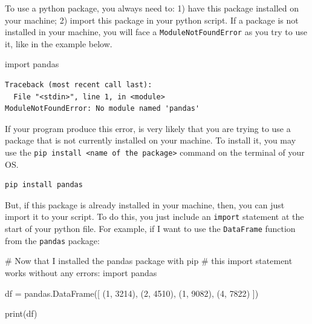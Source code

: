 \documentclass[
  11pt,
  letterpaper,
  DIV=11,
  numbers=noendperiod]{scrreprt}
\newenvironment{Shaded}{\begin{snugshade}}{\end{snugshade}}
\newcommand{\BuiltInTok}[1]{\textcolor[rgb]{0.00,0.23,0.31}{#1}}
\newcommand{\CommentTok}[1]{\textcolor[rgb]{0.37,0.37,0.37}{#1}}
\newcommand{\DecValTok}[1]{\textcolor[rgb]{0.68,0.00,0.00}{#1}}
\newcommand{\ImportTok}[1]{\textcolor[rgb]{0.00,0.46,0.62}{#1}}
\newcommand{\NormalTok}[1]{\textcolor[rgb]{0.00,0.23,0.31}{#1}}
\newcommand{\OperatorTok}[1]{\textcolor[rgb]{0.37,0.37,0.37}{#1}}
\begin{document}
To use a python package, you always need to: 1) have this package
installed on your machine; 2) import this package in your python script.
If a package is not installed in your machine, you will face a
\texttt{ModuleNotFoundError} as you try to use it, like in the example
below.

\begin{Shaded}
\begin{Highlighting}[]
\ImportTok{import}\NormalTok{ pandas}
\end{Highlighting}
\end{Shaded}

\begin{verbatim}
Traceback (most recent call last):
  File "<stdin>", line 1, in <module>
ModuleNotFoundError: No module named 'pandas'
\end{verbatim}

If your program produce this error, is very likely that you are trying
to use a package that is not currently installed on your machine. To
install it, you may use the
\texttt{pip\ install\ \textless{}name\ of\ the\ package\textgreater{}}
command on the terminal of your OS.

\begin{verbatim}
pip install pandas
\end{verbatim}

But, if this package is already installed in your machine, then, you can
just import it to your script. To do this, you just include an
\texttt{import} statement at the start of your python file. For example,
if I want to use the \texttt{DataFrame} function from the
\texttt{pandas} package:

\begin{Shaded}
\begin{Highlighting}[]
\CommentTok{\# Now that I installed the \textasciigrave{}pandas\textasciigrave{} package with \textasciigrave{}pip\textasciigrave{}}
\CommentTok{\# this \textasciigrave{}import\textasciigrave{} statement works without any errors:}
\ImportTok{import}\NormalTok{ pandas}

\NormalTok{df }\OperatorTok{=}\NormalTok{ pandas.DataFrame([}
\NormalTok{  (}\DecValTok{1}\NormalTok{, }\DecValTok{3214}\NormalTok{), (}\DecValTok{2}\NormalTok{, }\DecValTok{4510}\NormalTok{), }
\NormalTok{  (}\DecValTok{1}\NormalTok{, }\DecValTok{9082}\NormalTok{), (}\DecValTok{4}\NormalTok{, }\DecValTok{7822}\NormalTok{)}
\NormalTok{])}

\BuiltInTok{print}\NormalTok{(df)}
\end{Highlighting}
\end{Shaded}
\end{document}
